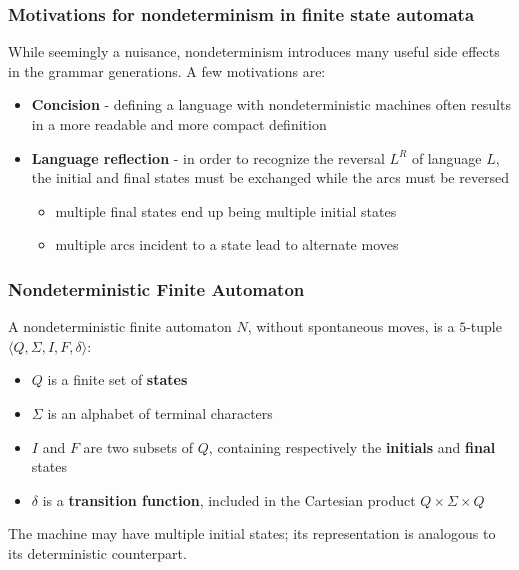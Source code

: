 \documentclass[english]{article}
\begin{document}
\subsubsection{Motivations for nondeterminism in finite state automata}

While seemingly a nuisance, nondeterminism introduces many useful side effects in the grammar generations.
A few motivations are:

\begin{itemize}
  \item \textbf{Concision} - defining a language with nondeterministic machines often results in a more readable and more compact definition
  \item \textbf{Language reflection} - in order to recognize the reversal \(L^R\) of language \(L\), the initial and final states must be exchanged while the arcs must be reversed
        \begin{itemize}[label=\(\rightarrow\)]
          \item multiple final states end up being multiple initial states
          \item multiple arcs incident to a state lead to alternate moves
        \end{itemize}
\end{itemize}

\subsubsection{Nondeterministic Finite Automaton}
\label{sec:nondeterministic-finite-automaton}

A nondeterministic finite automaton \(N\), without spontaneous moves, is a \(5\)-tuple \(\langle Q, \Sigma, I, F, \delta \rangle\):

\begin{itemize}
  \item \(Q\) is a finite set of \textbf{states}
  \item \(\Sigma\) is an alphabet of terminal characters
  \item \(I\) and \(F\) are two subsets of \(Q\), containing respectively the \textbf{initials} and \textbf{final} states
  \item \(\delta\) is a \textbf{transition function}, included in the Cartesian product \(Q \times \Sigma \times Q\)
\end{itemize}

The machine may have multiple initial states;
its representation is analogous to its deterministic counterpart.
\end{document}
